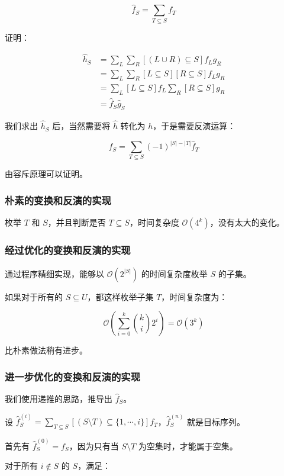 \documentclass{article}
\begin{document}
$$\hat f_S=\sum_{T \subseteq S} f_T$$

证明：

$$
\begin{aligned}
    \hat h_S &=\sum_{L} \sum_{R} [(L \cup R) \subseteq S] f_L g_R \\
         &= \sum_{L} \sum_{R} [L \subseteq S][R \subseteq S] f_L g_R \\
         &= \sum_{L} [L \subseteq S] f_L \sum_{R} [R \subseteq S] g_R \\
         &= \hat f_S \hat g_S
\end{aligned}
$$

我们求出 $\hat h_S$ 后，当然需要将 $\hat h$ 转化为 $h$，于是需要反演运算：

$$f_S=\sum_{T \subseteq S} (-1)^{|S|-|T|}\hat f_T$$

由容斥原理可以证明。

\subsubsection*{朴素的变换和反演的实现}

枚举 $T$ 和 $S$，并且判断是否 $T \subseteq S$，时间复杂度 $\mathcal O(4^k)$，没有太大的变化。

\subsubsection*{经过优化的变换和反演的实现}

通过程序精细实现，能够以 $\mathcal O(2^{|S|})$ 的时间复杂度枚举 $S$ 的子集。

如果对于所有的 $S \subseteq U$，都这样枚举子集 $T$，时间复杂度为：

$$\mathcal O\left(\sum_{i=0}^k \binom{k}{i}2^i\right)= \mathcal O(3^k)$$

比朴素做法稍有进步。

\subsubsection*{进一步优化的变换和反演的实现}

我们使用递推的思路，推导出 $\hat f_S$。

设 $\hat f_S^{(i)}=\sum_{T\subseteq S}[(S\setminus T)\subseteq\{1,\cdots,i\}]f_T$，$\hat f_S^{(n)}$ 就是目标序列。

首先有 $\hat f_S^{(0)}=f_S$，因为只有当 $S \setminus T$ 为空集时，才能属于空集。

对于所有 $i\notin S$ 的 $S$，满足：
\end{document}
